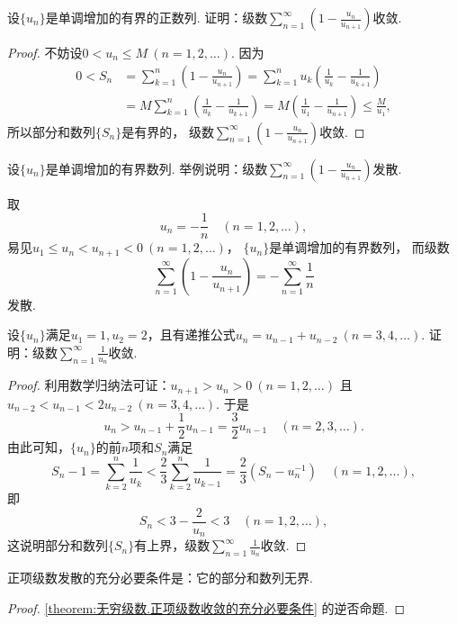 \begin{example}
设\(\{u_n\}\)是单调增加的有界的正数列.
证明：级数\(\sum_{n=1}^\infty \left(1-\frac{u_n}{u_{n+1}}\right)\)收敛.
\begin{proof}
不妨设\(0 < u_n \leq M\ (n=1,2,\dotsc)\).
因为\begin{align*}
	0 < S_n &= \sum_{k=1}^n \left(1-\frac{u_n}{u_{n+1}}\right)
	= \sum_{k=1}^n u_k \left(\frac1{u_k} - \frac1{u_{k+1}}\right) \\
	&= M \sum_{k=1}^n \left(\frac1{u_k} - \frac1{u_{k+1}}\right)
	= M \left(\frac1{u_1} - \frac1{u_{n+1}}\right)
	\leq \frac{M}{u_1},
\end{align*}
所以部分和数列\(\{S_n\}\)是有界的，
级数\(\sum_{n=1}^\infty \left(1-\frac{u_n}{u_{n+1}}\right)\)收敛.
\end{proof}
\end{example}
\begin{example}
设\(\{u_n\}\)是单调增加的有界数列.
举例说明：级数\(\sum_{n=1}^\infty \left(1-\frac{u_n}{u_{n+1}}\right)\)发散.
\begin{solution}
取\[
	u_n = -\frac1n
	\quad(n=1,2,\dotsc),
\]
易见\(u_1 \leq u_n < u_{n+1} < 0\ (n=1,2,\dotsc)\)，
\(\{u_n\}\)是单调增加的有界数列，
而级数\[
	\sum_{n=1}^\infty \left(1-\frac{u_n}{u_{n+1}}\right)
	= -\sum_{n=1}^\infty \frac1n
\]发散.
\end{solution}
\end{example}

\begin{example}
设\(\{u_n\}\)满足\(u_1 = 1, u_2 = 2\)，且有递推公式\(u_n = u_{n-1} + u_{n-2}\ (n=3,4,\dotsc)\).
证明：级数\(\sum_{n=1}^\infty \frac1{u_n}\)收敛.
\begin{proof}
利用数学归纳法可证：\(u_{n+1} > u_n > 0\ (n=1,2,\dotsc)\)
且\(u_{n-2} < u_{n-1} < 2 u_{n-2}\ (n=3,4,\dotsc)\).
于是\[
	u_n > u_{n-1} + \frac12 u_{n-1} = \frac32 u_{n-1}
	\quad(n=2,3,\dotsc).
\]
由此可知，\(\{u_n\}\)的前\(n\)项和\(S_n\)满足\[
	S_n - 1 = \sum_{k=2}^n \frac1{u_k}
	< \frac23 \sum_{k=2}^n \frac1{u_{k-1}}
	= \frac23 (S_n - u_n^{-1})
	\quad(n=1,2,\dotsc),
\]
即\[
	S_n < 3 - \frac2{u_n} < 3
	\quad(n=1,2,\dotsc),
\]
这说明部分和数列\(\{S_n\}\)有上界，级数\(\sum_{n=1}^\infty \frac1{u_n}\)收敛.
\end{proof}
\end{example}

\begin{proposition}
正项级数发散的充分必要条件是：它的部分和数列无界.
\begin{proof}
\cref{theorem:无穷级数.正项级数收敛的充分必要条件} 的逆否命题.
\end{proof}
\end{proposition}

